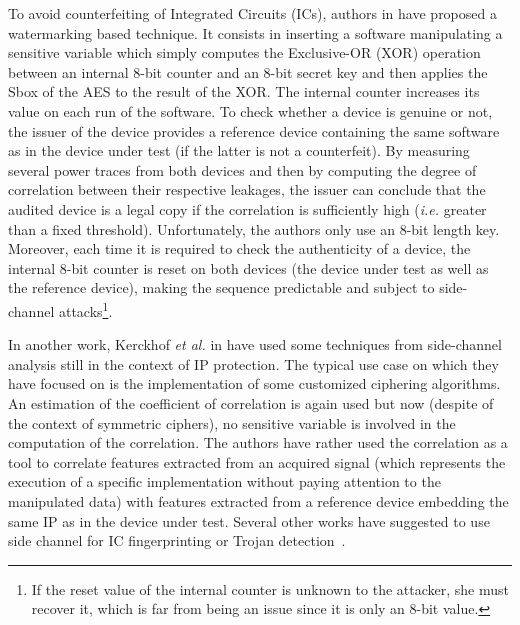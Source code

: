 \documentclass{llncs}
\newcommand\del[1]{}
\begin{document}
To avoid counterfeiting of Integrated Circuits (ICs), authors in \cite{DBLP:conf/socc/MarchandBJ14} have proposed a watermarking based technique. It consists in inserting a software manipulating a sensitive variable which simply computes the Exclusive-OR (XOR) operation between an internal $8$-bit counter and an $8$-bit secret key and then applies the Sbox of the AES to the result of the XOR. The internal counter increases its value on each run of the software. 
To check whether a device is genuine or not, the issuer of the device provides a reference device containing the same software as in the device under test (if the latter is not a counterfeit). By measuring several power traces from both devices and then by computing the degree of correlation between their respective leakages, the issuer can conclude that the audited device is a legal copy if the correlation is sufficiently high (\emph{i.e.} greater than a fixed threshold). 
Unfortunately, the authors only use an $8$-bit length key. Moreover, each time it is required to check the authenticity of a device, the internal $8$-bit counter is reset on both devices (the device under test as well as the reference device), making the sequence predictable and subject to side-channel attacks\footnote{If the reset value of the internal counter is unknown to the attacker, she must recover it, which is far from being an issue since it is only an $8$-bit value.}. 

In another work, Kerckhof \emph{et al.} in \cite{DBLP:conf/host/KerckhofDSG13} have used some techniques from side-channel analysis still in the context of IP protection. 
The typical use case on which they have focused on is the implementation of some customized ciphering algorithms. 
An estimation of the coefficient of correlation is again used but now (despite of the context of symmetric ciphers), no sensitive variable is involved in the computation of the correlation. 
The authors have rather used the correlation as a tool to correlate features extracted from an acquired signal (which represents the execution of a specific implementation without paying attention to the manipulated data) with features extracted from a reference device embedding the same IP as in the device under test. 
Several other works have suggested to use side channel for IC fingerprinting or Trojan detection~\cite{7256167,10.1007/978-3-642-15031-9_12}. \del{In most of the cases, it is required to have a reference design to exploit the leakage.}
\end{document}
